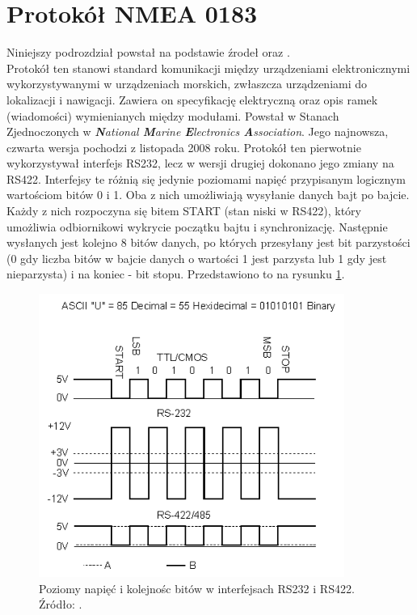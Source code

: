 \section{Protokół NMEA 0183}
\label{NMEA}

Niniejszy podrozdział powstał na podstawie źrodeł \cite{inzynierka} oraz \cite{QUECTEL_HW_DESIGN}.\\

Protokół ten stanowi standard komunikacji między urządzeniami elektronicznymi wykorzystywanymi w urządzeniach morskich, zwłaszcza urządzeniami do lokalizacji i nawigacji. Zawiera on specyfikację elektryczną oraz opis ramek (wiadomości) wymienianych między modułami. Powstał w Stanach Zjednoczonych w \textit{\textbf{N}ational \textbf{M}arine \textbf{E}lectronics \textbf{A}ssociation}. Jego najnowsza, czwarta wersja pochodzi z listopada 2008 roku. 
Protokół ten pierwotnie wykorzystywał interfejs RS232, lecz w wersji drugiej dokonano jego zmiany na RS422. Interfejsy te różnią się jedynie poziomami napięć przypisanym logicznym wartościom bitów 0 i 1. 
Oba z nich umożliwiają wysyłanie danych bajt po bajcie. Każdy z nich rozpoczyna się bitem START (stan niski w RS422), który umożliwia odbiornikowi wykrycie początku bajtu i synchronizację. Następnie wysłanych jest kolejno 8 bitów danych, po których przesyłany jest bit parzystości (0 gdy liczba bitów w bajcie danych o wartości 1 jest parzysta lub 1 gdy jest nieparzysta) i na koniec - bit stopu. Przedstawiono to na rysunku \ref{fig:image_nmea_rs422}.

\begin{figure}[H]
	\centering
	\includegraphics[width=10cm]{img/theory/NMEA/RS232_RS422.png}
	\caption{Poziomy napięć i kolejnośc bitów w interfejsach RS232 i RS422. Źródło: \cite{RS422}.}
	\label{fig:image_nmea_rs422}
\end{figure}

